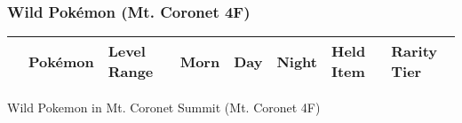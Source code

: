 \subsubsection{Wild Pokémon (Mt. Coronet 4F)}%
\label{ssubsec:WildPokmon(Mt.Coronet4F)}%
\begin{longtable}{||l l l l l l l l||}%
\hline%
\rowcolor{gray}%
&Pokémon&Level Range&Morn&Day&Night&Held Item&Rarity Tier\\%
\hline%
\endhead%
\hline%
\end{longtable}%
\caption{Wild Pokemon in Mt. Coronet Summit (Mt. Coronet 4F)}
